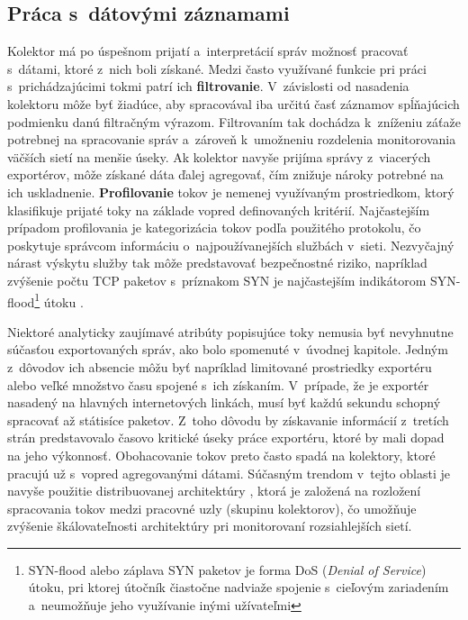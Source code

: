 \subsection*{Práca s~dátovými záznamami}

Kolektor má po úspešnom prijatí a~interpretácií správ možnosť pracovať s~dátami, ktoré z~nich boli získané. Medzi často využívané funkcie pri práci s~prichádzajúcimi tokmi patrí ich \textbf{filtrovanie}. V~závislosti od nasadenia kolektoru môže byť žiadúce, aby spracovával iba
určitú časť záznamov spĺňajúcich podmienku danú filtračným výrazom. Filtrovaním tak dochádza k~zníženiu záťaže potrebnej na spracovanie správ a~zároveň k~umožneniu rozdelenia monitorovania väčších sietí na menšie úseky.
Ak kolektor navyše prijíma správy z~viacerých exportérov, môže získané dáta ďalej agregovať, čím znižuje nároky potrebné na ich uskladnenie. \textbf{Profilovanie} tokov je nemenej využívaným prostriedkom, ktorý klasifikuje prijaté toky na základe vopred definovaných kritérií.
Najčastejším prípadom profilovania je kategorizácia tokov podľa použitého protokolu, čo poskytuje správcom informáciu o~najpoužívanejších službách v~sieti. Nezvyčajný nárast výskytu služby tak môže predstavovať bezpečnostné riziko, napríklad zvýšenie počtu TCP paketov s~príznakom SYN je
najčastejším indikátorom SYN-flood\footnote{SYN-flood alebo záplava SYN paketov je forma DoS (\textit{Denial of Service}) útoku, pri ktorej útočník čiastočne nadviaže spojenie s~cieľovým zariadením a~neumožňuje jeho využívanie inými užívateľmi} útoku \cite{wiki:SYN_flood}.

Niektoré analyticky zaujímavé atribúty popisujúce toky nemusia byť nevyhnutne súčasťou exportovaných správ, ako bolo spomenuté v~úvodnej kapitole. Jedným z~dôvodov ich absencie môžu byť napríklad limitované prostriedky exportéru alebo veľké množstvo času spojené s~ich získaním.
V~prípade, že je exportér nasadený na hlavných internetových linkách, musí byť každú sekundu schopný spracovať až státisíce paketov. Z~toho dôvodu by získavanie informácií z~tretích strán predstavovalo časovo kritické úseky práce exportéru, ktoré
by mali dopad na jeho výkonnosť. Obohacovanie tokov preto často spadá na kolektory, ktoré pracujú už s~vopred agregovanými dátami. Súčasným trendom v~tejto oblasti je navyše použitie distribuovanej architektúry \cite{distribuovana_architektura}, ktorá je založená na rozložení
spracovania tokov medzi pracovné uzly (skupinu kolektorov), čo umožňuje zvýšenie škálovateľnosti architektúry pri monitorovaní rozsiahlejších sietí.

